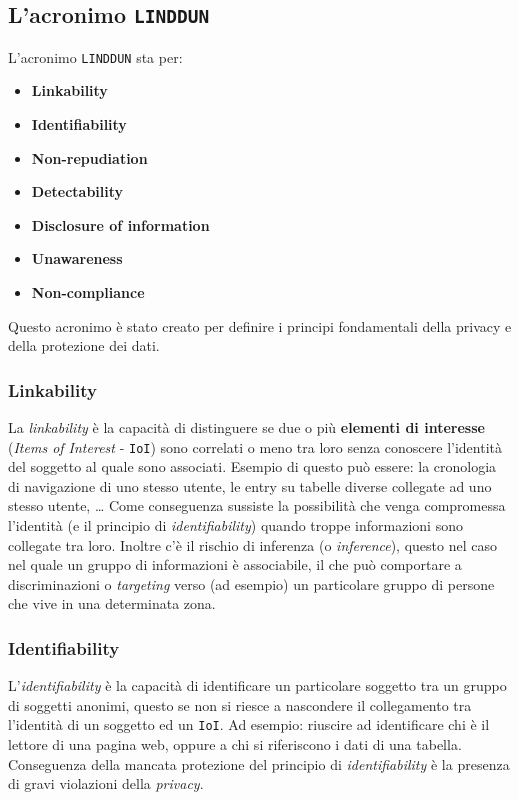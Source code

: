     \subsection{L'acronimo \texttt{LINDDUN}}
        L'acronimo \texttt{LINDDUN} sta per:
        \begin{itemize}
            \item \textbf{Linkability}
            \item \textbf{Identifiability}
            \item \textbf{Non-repudiation}
            \item \textbf{Detectability}
            \item \textbf{Disclosure of information}
            \item \textbf{Unawareness}
            \item \textbf{Non-compliance}
        \end{itemize}
        Questo acronimo è stato creato per definire i principi fondamentali della privacy e della protezione dei dati.
        \subsubsection{Linkability}
            La \textit{linkability} è la capacità di distinguere se due o più \textbf{elementi di interesse} (\textit{Items of Interest} - \texttt{IoI}) sono correlati o meno tra loro senza conoscere l'identità del soggetto al quale sono associati. Esempio di questo può essere: la cronologia di navigazione di uno stesso utente, le entry su tabelle diverse collegate ad uno stesso utente, \dots\newline
            Come conseguenza sussiste la possibilità che venga compromessa l'identità (e il principio di \textit{identifiability}) quando troppe informazioni sono collegate tra loro. Inoltre c'è il rischio di inferenza (o \textit{inference}), questo nel caso nel quale un gruppo di informazioni è associabile, il che può comportare a discriminazioni o \textit{targeting} verso (ad esempio) un particolare gruppo di persone che vive in una determinata zona.
        \subsubsection{Identifiability}
            L'\textit{identifiability} è la capacità di identificare un particolare soggetto tra un gruppo di soggetti anonimi, questo se non si riesce a nascondere il collegamento tra l'identità di un soggetto ed un \texttt{IoI}. Ad esempio: riuscire ad identificare chi è il lettore di una pagina web, oppure a chi si riferiscono i dati di una tabella. Conseguenza della mancata protezione del principio di \textit{identifiability} è la presenza di gravi violazioni della \textit{privacy}.
